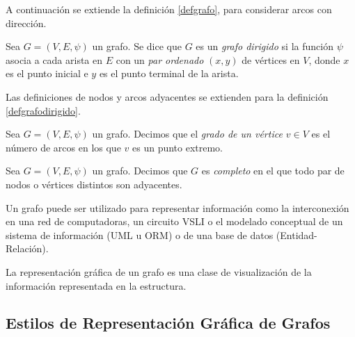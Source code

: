 A continuación se  extiende la definición \ref{defgrafo}, para considerar arcos con dirección.

\begin{definition}\label{defgrafodirigido}\cite{gersting2007mathematical} 
Sea  $G=(V,E,\psi)$ un grafo. Se dice que $G$ es  un  {\em grafo  dirigido} si la función  $\psi$ asocia a cada arista en  $E$ con un {\em par  ordenado} $(x,y)$ de vértices en $V$, donde $x$ es el punto inicial e $y$ es el punto terminal de la arista. 
\end{definition}

Las definiciones de nodos y arcos adyacentes se extienden para la definición \ref{defgrafodirigido}.

\begin{definition}\cite{gersting2007mathematical}\label{defgradovertice}
Sea  $G=(V,E,\psi)$ un grafo. Decimos que el {\em grado de un vértice $v\in V$} es el número de arcos en los que $v$ es un punto extremo.
\end{definition}

\begin{definition}\cite{gersting2007mathematical}
Sea  $G=(V,E,\psi)$ un grafo. Decimos que $G$ es {\em completo} en el que  todo par de nodos o vértices  distintos son adyacentes.
\end{definition}

Un grafo puede ser utilizado para representar información como la interconexión en una red de computadoras, un circuito VSLI o el modelado conceptual de un sistema de información (UML\cite{eichelberger2003uml,auer2007explorative} u ORM\cite{halpin2005orm}) o de una base de datos (Entidad-Relación\cite{chen1988entity}).


La representación gráfica  de un grafo es  una clase de visualización de la información representada en la estructura. 


\subsection{Estilos de Representación Gráfica de Grafos}
\label{sec:estilos_de_dibujado}

